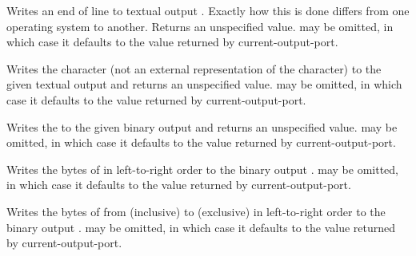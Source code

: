 \begin{entry}{%
}

Writes an end of line to textual output .  Exactly how this
is done differs
from one operating system to another.  Returns an unspecified value.
 may be omitted, in which case it defaults to the
value returned by {\cf current-output-port}.

\end{entry}


\begin{entry}{%
}

Writes the character  (not an external representation of the
character) to the given textual output  and returns an unspecified
value.  
 may be omitted, in which case it defaults to the value
returned by {\cf current-output-port}.

\end{entry}

\begin{entry}{%
}

Writes the  to
the given binary output  and returns an unspecified value.
 may be omitted, in which case it defaults to
the value returned by {\cf current-output-port}.

\end{entry}

\begin{entry}{%
}

Writes the bytes of  in left-to-right order to the
binary output .
 may be
omitted, in which case it defaults to the value returned by {\cf
  current-output-port}.

\end{entry}

\begin{entry}{%
}

Writes the bytes of 
from  (inclusive) to  (exclusive)
in left-to-right order to the
binary output .
 may be
omitted, in which case it defaults to the value returned by {\cf
  current-output-port}.

\end{entry}

